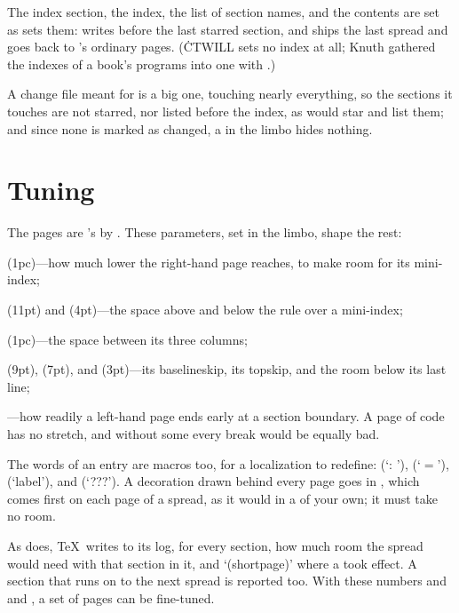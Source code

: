 \bull The index section, the index, the list of section names, and the contents
are set as  sets them:  writes  before the
last starred section, and  ships the last spread and goes back to
's ordinary pages. (\.{CTWILL} sets no index at all; Knuth gathered
the indexes of a book's programs into one with .)

\bull A change file meant for  is a big one, touching nearly
everything, so the sections it touches are not starred, nor listed before the
index, as  would star and list them; and since none is marked as
changed, a  in the limbo hides nothing.

\chapter{Tuning}
\noindent The pages are 's  by
. These parameters, set in the limbo, shape the rest:

\bull {} (1pc)---how much lower the right-hand page reaches, to
make room for its mini-index;

\bull {} (11pt) and  (4pt)---the space above and
below the rule over a mini-index;

\bull {} (1pc)---the space between its three columns;

\bull {} (9pt),  (7pt), and 
(3pt)---its baselineskip, its topskip, and the room below its last line;

\bull {}---how readily a left-hand page ends early at a section
boundary. A page of code has no stretch, and without some every break would be
equally bad.

\noindent The words of an entry are macros too, for a localization to
redefine:  (`: '),  (`\thinspace$=$\thinspace'),
 (`label'), and  (`???'). A decoration
drawn behind every page goes in , which comes first on
each page of a spread, as it would in a  of your own; it must
take no room.

As  does, \TeX\ writes to its log, for every section, how much
room the spread would need with that section in it, and
`(shortpage)' where a  took effect. A section that runs on to
the next spread is reported too. With these numbers and  and
, a set of pages can be fine-tuned.

